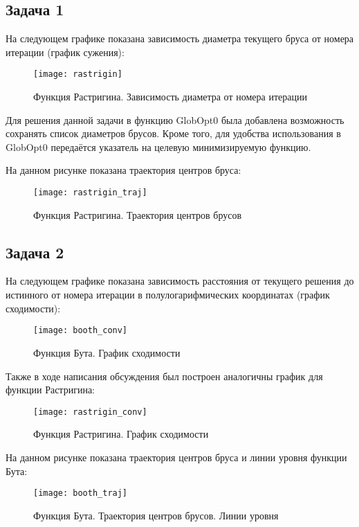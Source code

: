 \subsection{Задача 1}

На следующем графике показана зависимость диаметра текущего бруса от номера итерации (график сужения):

\begin{figure}[H]
	\begin{center}
		\texttt{[image: rastrigin]}
		\label{pic:rasstrigin_constriction}
		\caption{Функция Растригина. Зависимость диаметра от номера итерации}
	\end{center}
\end{figure}

Для решения данной задачи в функцию GlobOpt0 была добавлена возможность сохранять список диаметров брусов. Кроме того, для удобства использования в GlobOpt0 передаётся указатель на целевую минимизируемую функцию.

На данном рисунке показана траектория центров бруса:

\begin{figure}[H]
	\begin{center}
		\texttt{[image: rastrigin\_traj]}
		\label{pic:rastrigin_traj}
		\caption{Функция Растригина. Траектория центров брусов}
	\end{center}
\end{figure}

\subsection{Задача 2}
На следующем графике показана зависимость расстояния от текущего решения до истинного от номера итерации в полулогарифмических координатах (график сходимости):

\begin{figure}[H]
	\begin{center}
		\texttt{[image: booth\_conv]}
		\label{pic:booth_conv}
		\caption{Функция Бута. График сходимости}
	\end{center}
\end{figure}

Также в ходе написания обсуждения был построен аналогичны график для функции Растригина:

\begin{figure}[H]
	\begin{center}
		\texttt{[image: rastrigin\_conv]}
		\label{pic:rastrigin_conv}
		\caption{Функция Растригина. График сходимости}
	\end{center}
\end{figure}

На данном рисунке показана траектория центров бруса и линии уровня функции Бута:

\begin{figure}[H]
	\begin{center}
		\texttt{[image: booth\_traj]}
		\label{pic:booth_traj}
		\caption{Функция Бута. Траектория центров брусов. Линии уровня}
	\end{center}
\end{figure}
